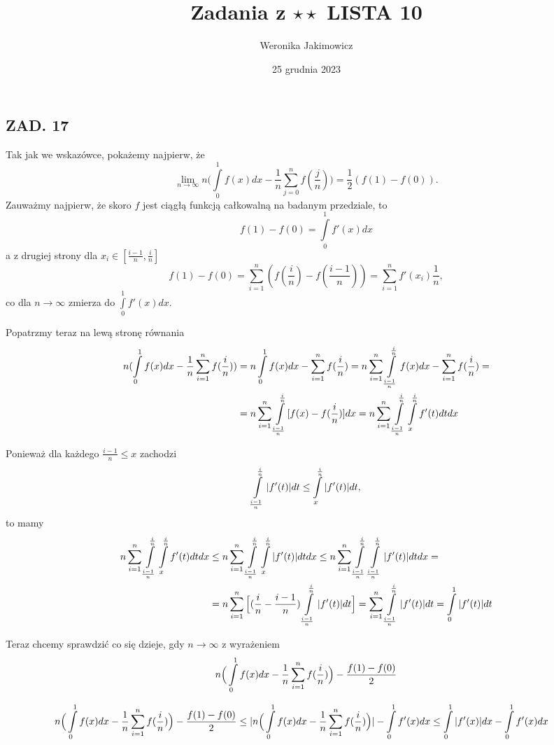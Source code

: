\documentclass{article}[13pt]
\author{Weronika Jakimowicz}
\title{Zadania z $\star\star$ LISTA 10}
\date{25 grudnia 2023}
\begin{document}
\maketitle

\subsection*{ZAD. 17}
Tak jak we wskazówce, pokażemy najpierw, że
$$\lim\limits_{n\to\infty}n\Big(\int\limits_0^1f(x)dx-\frac1n\sum\limits_{j=0}^nf(\frac jn)\Big)=\frac12(f(1)-f(0)).$$
Zauważmy najpierw, że skoro $f$ jest ciągłą funkcją całkowalną na badanym przedziale, to
$$f(1)-f(0)=\int\limits_0^1f'(x)dx$$
a z drugiej strony dla $x_i\in[\frac {i-1}n,\frac in]$
$$f(1)-f(0)=\sum\limits_{i=1}^n(f(\frac in)-f(\frac{i-1}n))=\sum\limits_{i=1}^nf'(x_i)\frac1n,$$
co dla $n\to\infty$ zmierza do $\int\limits_0^1f'(x)dx$.

Popatrzmy teraz na lewą stronę równania
\begin{align*}
    n(\int\limits_0^1f(x)dx-\frac1n\sum\limits_{i=1}^nf(\frac in))&=n\int\limits_0^1f(x)dx-\sum\limits_{i=1}^nf(\frac in)=n\sum\limits_{i=1}^n\int\limits_\frac {i-1}n^\frac{i}nf(x)dx-\sum\limits_{i=1}^nf(\frac in)=\\
    &=n\sum\limits_{i=1}^n\int\limits_{\frac{i-1}n}^\frac in[f(x)-f(\frac in)]dx=n\sum\limits_{i=1}^n\int\limits_{{i-1\over n}}^\frac in\int\limits_x^{\frac in}f'(t)dtdx
\end{align*}

Ponieważ dla każdego $\frac {i-1}n\leq x$ zachodzi
$$\int\limits_{{i-1\over n}}^\frac in |f'(t)|dt\leq \int\limits_x^\frac in |f'(t)|dt,$$
to mamy
\begin{align*}
    n\sum\limits_{i=1}^n\int\limits_{{i-1\over n}}^\frac in\int\limits_x^{\frac in}f'(t)dtdx&\leq n\sum\limits_{i=1}^n\int\limits_{{i-1\over n}}^\frac in\int\limits_x^{\frac in}|f'(t)|dtdx\leq n\sum\limits_{i=1}^n\int\limits_{{i-1\over n}}^\frac in\int\limits_{{i-1\over n}}^\frac in |f'(t)|dtdx=\\
    &=n\sum\limits_{i=1}^n\Big[(\frac in-\frac{i-1}n)\int\limits_{{i-1\over n}}^\frac in |f'(t)|dt\Big]=\sum\limits_{i=1}^n\int\limits_{{i-1\over n}}^\frac in |f'(t)|dt=\int\limits_0^1|f'(t)|dt
\end{align*}

Teraz chcemy sprawdzić co się dzieje, gdy $n\to\infty$ z wyrażeniem
$$n\Big(\int\limits_0^1f(x)dx-\frac 1n\sum\limits_{i=1}^nf(\frac in)\Big)-{f(1)-f(0)\over 2}$$

\begin{align*}
    n\Big(\int\limits_0^1f(x)dx-\frac 1n\sum\limits_{i=1}^nf(\frac in)\Big)-{f(1)-f(0)\over 2}&\leq|n\Big(\int\limits_0^1f(x)dx-\frac1n\sum\limits_{i=1}^nf(\frac in)\Big)|-\int\limits_0^1f'(x)dx\leq \int\limits_0^1|f'(x)|dx-\int\limits_0^1f'(x)dx
\end{align*}
\end{document}
